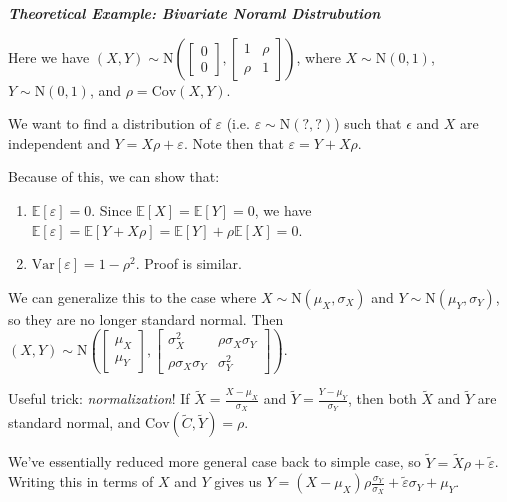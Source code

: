 \documentclass[11pt]{article}
\theoremstyle{definition}
\begin{document}
\textbf{\textsl{Theoretical Example: Bivariate Noraml Distrubution}}

Here we have \((X,Y) \sim \mathrm{N}\left( \begin{bmatrix}
	0 \\ 0
\end{bmatrix}, \begin{bmatrix}
	1 & \rho \\ \rho & 1
\end{bmatrix} \right)\), where \(X \sim \mathrm{N}(0,1)\), \(Y \sim \mathrm{N}(0,1)\), and \(\rho = \mathrm{Cov}(X,Y)\).

We want to find a distribution of \(\varepsilon\) (i.e. \(\varepsilon\sim\mathrm{N}(?,?)\)) such that
\(\epsilon\) and \(X\) are independent and \(Y = X \rho + \varepsilon\). Note then that \(\varepsilon = Y + X \rho\).

Because of this, we can show that:
\begin{enumerate}
	\item \(\mathbb{E}[\varepsilon] = 0\). Since \(\mathbb{E}[X] = \mathbb{E}[Y]=0\), we have \(\mathbb{E}[\varepsilon] = \mathbb{E}[Y + X \rho] = \mathbb{E}[Y] + \rho \mathbb{E}[X] = 0\).
	\item \(\mathrm{Var}[\varepsilon] = 1 - \rho^2\). Proof is similar. 
\end{enumerate}

We can generalize this to the case where \(X \sim \mathrm{N}(\mu_X, \sigma_X)\) and \(Y\sim\mathrm{N}(\mu_Y,\sigma_Y)\), so they are no longer standard normal. 
Then \((X,Y) \sim \mathrm{N} \left( \begin{bmatrix}
	\mu_X \\ \mu_Y
\end{bmatrix}, \begin{bmatrix}
	\sigma_X^2 & \rho \sigma_X \sigma_Y \\ \rho \sigma_X \sigma_Y & \sigma_Y^2
\end{bmatrix} \right).\)

Useful trick: \textsl{normalization}! If \(\tilde{X} = \frac{X - \mu_X}{\sigma_X}\) and \(\tilde{Y} = \frac{Y - \mu_Y}{\sigma_Y}\), then both \(\tilde{X}\)
and \(\tilde{Y}\) are standard normal, and \(\mathrm{Cov}(\tilde{C},\tilde{Y}) = \rho\). 

We've essentially reduced more general case back to simple case, so \(\tilde{Y} = \tilde{X}\rho + \tilde{\varepsilon}\). Writing this in terms of \(X\) and \(Y\) gives us
\(Y = \left( X - \mu_X \right) \rho \frac{\sigma_Y}{\sigma_X} + \tilde{\varepsilon}\sigma_Y + \mu_Y	\).
\end{document}
